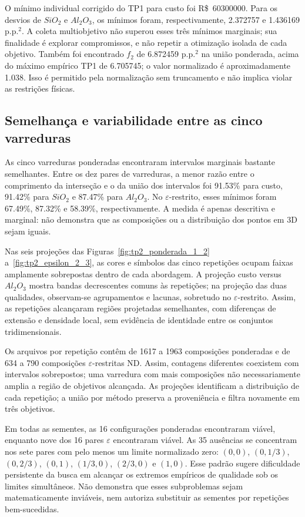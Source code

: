 \documentclass[12pt,a4paper]{article}
\begin{document}
O mínimo individual corrigido do TP1 para custo foi R\$~\num{60300000}.
Para os desvios de $SiO_2$ e $Al_2O_3$, os mínimos foram, respectivamente,
\num{2.372757} e \num{1.436169} p.p.$^2$. A coleta multiobjetivo não
superou esses três mínimos marginais; sua finalidade é explorar
compromissos, e não repetir a otimização isolada de cada objetivo.
Também foi encontrado $f_2$ de \num{6.872459} p.p.$^2$ na união ponderada,
acima do máximo empírico TP1 de \num{6.705745}; o valor normalizado é
aproximadamente \num{1.038}. Isso é permitido pela normalização sem
truncamento e não implica violar as restrições físicas.

\subsection{Semelhança e variabilidade entre as cinco varreduras}

As cinco varreduras ponderadas encontraram intervalos marginais bastante
semelhantes. Entre os dez pares de varreduras, a menor razão entre o
comprimento da interseção e o da união dos intervalos foi
\num{91.53}\% para custo, \num{91.42}\% para $SiO_2$ e \num{87.47}\%
para $Al_2O_3$. No $\varepsilon$-restrito, esses mínimos foram
\num{67.49}\%, \num{87.32}\% e \num{58.39}\%, respectivamente.
A medida é apenas descritiva e marginal: não demonstra que as composições
ou a distribuição dos pontos em 3D sejam iguais.

Nas seis projeções das Figuras~\ref{fig:tp2_ponderada_1_2}
a~\ref{fig:tp2_epsilon_2_3}, as cores e símbolos das cinco repetições
ocupam faixas amplamente sobrepostas dentro de cada abordagem. A projeção
custo versus $Al_2O_3$ mostra bandas decrescentes comuns às repetições;
na projeção das duas qualidades, observam-se agrupamentos e lacunas,
sobretudo no $\varepsilon$-restrito. Assim, as repetições alcançaram regiões
projetadas semelhantes, com diferenças de extensão e densidade local,
sem evidência de identidade entre os conjuntos tridimensionais.

Os arquivos por repetição contêm de \num{1617} a \num{1963} composições
ponderadas e de \num{634} a \num{790} composições $\varepsilon$-restritas
ND. Assim, contagens diferentes coexistem com intervalos sobrepostos;
uma varredura com mais composições não necessariamente amplia a região
de objetivos alcançada. As projeções identificam a distribuição de cada
repetição; a união por método preserva a proveniência e filtra novamente
em três objetivos.

Em todas as sementes, as 16 configurações ponderadas encontraram viável,
enquanto nove dos 16 pares $\varepsilon$ encontraram viável. As 35 ausências
se concentram nos sete pares com pelo menos um limite normalizado zero:
$(0,0)$, $(0,1/3)$, $(0,2/3)$, $(0,1)$, $(1/3,0)$, $(2/3,0)$ e $(1,0)$.
Esse padrão sugere dificuldade persistente da busca em alcançar os
extremos empíricos de qualidade sob os limites simultâneos. Não demonstra
que esses subproblemas sejam matematicamente inviáveis, nem autoriza
substituir as sementes por repetições bem-sucedidas.
\end{document}
